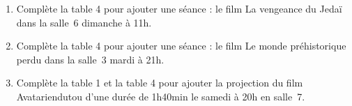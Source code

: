 \documentclass[class=report,crop=false, 12pt]{standalone}
\begin{document}
\begin{activite}
\sauteligne

\begin{enumerate}
  \item Complète la table 4 pour ajouter une séance : le film \og La vengeance du Jedaï \fg{} dans la salle~6 dimanche à 11h.
  
  \item Complète la table 4 pour ajouter une séance : le film \og Le monde préhistorique perdu \fg{} dans la salle~3 mardi à 21h.  
  
  \item Complète la table 1 et la table 4 pour ajouter la projection du film 
  \og Avatariendutou \fg{} d'une durée de 1h40min le samedi à 20h en salle~7.
  
\end{enumerate}

\end{activite}
\end{document}
